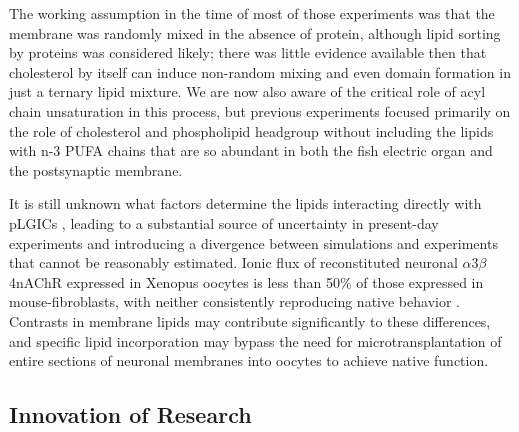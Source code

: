 \documentclass{article}
\begin{document}
The working assumption in the time of most of those experiments was that the membrane was randomly mixed in the absence of protein, although lipid sorting by proteins was considered likely; there was little evidence available then that cholesterol by itself can induce non-random mixing and even domain formation in just a ternary lipid mixture. We are now also aware of the critical role of acyl chain unsaturation in this process, but previous experiments focused primarily on the role of cholesterol and phospholipid headgroup without including the lipids with n-3 PUFA chains that are so abundant in both the fish electric organ and the postsynaptic membrane.

It is still unknown what factors determine the lipids interacting directly with pLGICs , leading to a substantial source of uncertainty in present-day experiments and introducing a divergence between simulations and experiments that cannot be reasonably estimated. Ionic flux of reconstituted neuronal $\alpha$3$\beta$4nAChR expressed in Xenopus oocytes is less than 50\% of those expressed in mouse-fibroblasts, with neither consistently reproducing native behavior \cite{Fong_Correlation_1986,Sunshine_Lipid_1992,Hamouda_Assessing_2006,Butler_FTIR_1993,Bhushan_Correlation_1993,Fong_Stabilization_1987,Bednarczyk_Transmembrane_2002,Corrie_Lipid_2002}. Contrasts in membrane lipids may contribute significantly to these differences, and specific lipid incorporation may bypass the need for microtransplantation of entire sections of neuronal membranes \cite{Conti2013} into oocytes to achieve native function.

\subsection{Innovation of Research}
\end{document}
